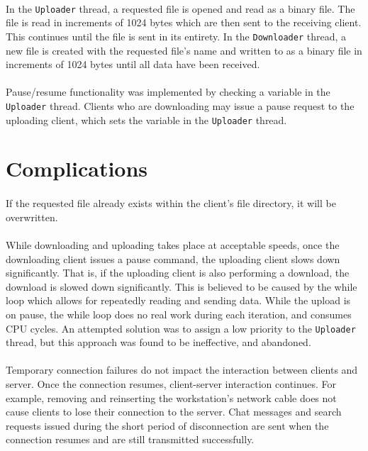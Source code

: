 \documentclass[10pt,a4paper]{article}
\begin{document}
\paragraph{} 
In the \verb|Uploader| thread, a requested file is opened and read as a binary file. The file is read in increments of 1024 bytes which are
then sent to the receiving client. This continues until the file is sent in its entirety. In the \verb|Downloader| thread, a new file is
created with the requested file's name and written to as a binary file in increments of 1024 bytes until all data have been received.
\paragraph{} 
Pause/resume functionality was implemented by checking a variable in the \verb|Uploader| thread. Clients who are downloading may issue a pause request to the uploading client, which sets the variable in the \verb|Uploader| thread.

\section{Complications}
\label{comp}
\paragraph{} 
If the requested file already exists
within the client's file directory, it will be overwritten. 
\paragraph{} 
While downloading and uploading takes place at acceptable speeds, once the downloading client issues a pause command, the uploading client
slows down significantly. That is, if the uploading client is also performing a download, the download is slowed down significantly. 
This is believed to be caused by the while loop which allows for repeatedly reading and sending data. While the upload is
on pause, the while loop does no real work during each iteration, and consumes CPU cycles. An attempted solution was to assign a low priority to
the \verb|Uploader| thread, but this approach was found to be ineffective, and abandoned.
\paragraph{} 
Temporary connection failures do not impact the interaction between clients and server. Once the connection resumes, client-server interaction
continues. For example, removing and reinserting the workstation's network cable does not cause clients to lose
their connection to the server. Chat messages and search requests issued during the short period of disconnection
are sent when the connection resumes and are still transmitted successfully.
\end{document}

